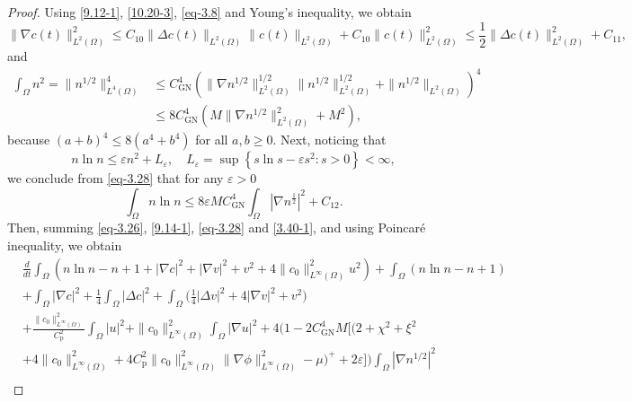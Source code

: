 \documentclass[reqno]{amsart}
\begin{document}
\begin{proof}
Using \eqref{9.12-1}, \eqref{10.20-3}, \eqref{eq-3.8} and Young's inequality, we obtain
\begin{equation}\label{9.14-1}
\|\nabla c(t)\|_{L^2(\Omega)}^2
\leq C_{10} \|\Delta c(t)\|_{L^2(\Omega)} \|c(t)\|_{L^2(\Omega)}
+ C_{10} \|c(t)\|^2_{L^2(\Omega)} 
\leq \frac{1}{2} \|\Delta c(t)\|_{L^2(\Omega)}^2 + C_{11},
\end{equation}
and
\begin{equation}\label{eq-3.28}
\begin{aligned}
\int_{\Omega} n^2 = \| n^{1/2}\|_{L^4(\Omega)}^4
&\leq C_{\mathrm{GN}}^4 ( \| \nabla n^{1/2} \|_{L^2(\Omega)}^{1/2}
\| n^{1/2} \|_{L^2(\Omega)}^{1/2} + \| n^{1/2}\|_{L^2(\Omega)} )^4 \\
&\leq 8 C_{\mathrm{GN}}^4 ( M \| \nabla n^{1/2} \|_{L^2(\Omega)}^2 + M^2),
\end{aligned}
\end{equation}
because $ (a + b)^4 \leq 8(a^4 + b^4) $ for all $ a, b \geq 0$.
Next, noticing that
\[
n\ln n \leq \varepsilon n^2 + L_\varepsilon,\quad 
L_\varepsilon = \sup\left\{ s \ln s - \varepsilon s^2 : s > 0 \right\}<\infty,
\]
we conclude from \eqref{eq-3.28} that for any $\varepsilon>0$
\begin{equation}\label{3.40-1}
\int_{\Omega} n\ln n \leq 8\varepsilon M C_{\mathrm{GN}}^4
\int_{\Omega} |\nabla n^{\frac12}|^2 + C_{12}.
\end{equation}
Then, summing  \eqref{eq-3.26}, \eqref{9.14-1}, \eqref{eq-3.28} and \eqref{3.40-1}, 
and using Poincar\'e inequality, we obtain
\begin{equation}\label{eq-3.30}
\begin{aligned}
&\frac{d}{dt} \int_\Omega \left( n \ln n - n + 1 + |\nabla c|^2 
 + |\nabla v|^2 + v^2+ 4\|c_0\|_{L^\infty(\Omega)}^2 u^2 \right)
 +\int_\Omega \left( n \ln n - n + 1\right)\\ 
&+\int_{\Omega} |\nabla c|^2 +\frac{1}{4}\int_{\Omega} |\Delta c|^2
 +\int_{\Omega}\Big(\frac{1}{4} |\Delta v|^2+4|\nabla v|^2+ v^2\Big) \\
&+\frac{\|c_0\|_{L^\infty(\Omega)}^2}{C^2_{\mathrm{p}}}\int_{\Omega} |u|^2
 +\|c_0\|_{L^\infty(\Omega)}^2\int_{\Omega} |\nabla u|^2  
 + 4 \Big( 1 - 2 C_{\mathrm{GN}}^4 M \Big[ \Big( 2 + \chi^2 + \xi^2 \\
&+ 4\|c_0\|_{L^\infty(\Omega)}^2+ 4 C_{\mathrm{p}}^2\|c_0\|_{L^\infty(\Omega)}^2
  \|\nabla \phi\|_{L^\infty(\Omega)}^2 - \mu \Big)^+ 
  + 2\varepsilon \Big] \Big) \int_{\Omega} | \nabla n^{1/2} |^2 \\

\end{aligned}
\end{equation}
\end{proof}
\end{document}
